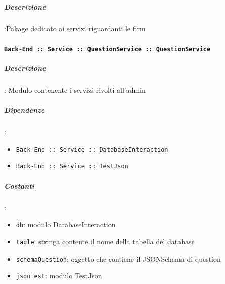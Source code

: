 \documentclass[../DefinizioneDiProdotto_v3.0.0.tex]{subfiles}
\begin{document}
\subparagraph{Descrizione}:Pakage dedicato ai servizi riguardanti le firm

\paragraph{\texttt{Back-End :: Service :: QuestionService :: QuestionService}}
\subparagraph{Descrizione}: Modulo contenente i servizi rivolti all'admin
\subparagraph{Dipendenze}:
\begin{itemize}
	\item \texttt{Back-End :: Service :: DatabaseInteraction}
	\item \texttt{Back-End :: Service :: TestJson}
\end{itemize}
\subparagraph{Costanti}:
\begin{itemize}
	\item \texttt{db}: modulo DatabaseInteraction
	\item \texttt{table}: stringa contente il nome della tabella del database
	\item \texttt{schemaQuestion}: oggetto che contiene il JSONSchema di question
	\item \texttt{jsontest}: modulo TestJson
\end{itemize}
\end{document}
